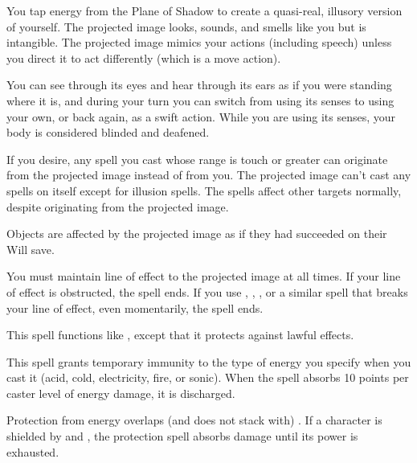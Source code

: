 \spellrng{\rngmed}
\begin{spelleffect}
  You tap energy from the Plane of Shadow to create a quasi-real, illusory version of yourself. The projected image looks, sounds, and smells like you but is intangible. The projected image mimics your actions (including speech) unless you direct it to act differently (which is a move action).
  \par You can see through its eyes and hear through its ears as if you were standing where it is, and during your turn you can switch from using its senses to using your own, or back again, as a swift action. While you are using its senses, your body is considered blinded and deafened.
  \par If you desire, any spell you cast whose range is touch or greater can originate from the projected image instead of from you. The projected image can't cast any spells on itself except for illusion spells. The spells affect other targets normally, despite originating from the projected image.
\end{spelleffect}
\begin{spellnotes}
  Objects are affected by the projected image as if they had succeeded on their Will save.
  \par You must maintain line of effect to the projected image at all times. If your line of effect is obstructed, the spell ends. If you use , , , or a similar spell that breaks your line of effect, even momentarily, the spell ends.
\end{spellnotes}

\begin{spelleffect}
  This spell functions like , except that it protects against lawful effects.
\end{spelleffect}

\begin{spelleffect}
  This spell grants temporary immunity to the type of energy you specify when you cast it (acid, cold, electricity, fire, or sonic). When the spell absorbs 10 points per caster level of energy damage, it is discharged.
\end{spelleffect}
\begin{spellnotes}
  Protection from energy overlaps (and does not stack with) . If a character is shielded by  and , the protection spell absorbs damage until its power is exhausted.
\end{spellnotes}

